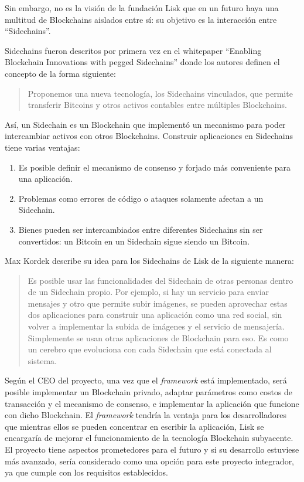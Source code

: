 Sin embargo, no es la visión de la fundación Lisk que en un futuro haya una multitud de Blockchains aislados entre sí: su objetivo es la interacción entre ``Sidechains''.

 
Sidechains fueron descritos por primera vez en el whitepaper ``Enabling Blockchain Innovations with pegged Sidechains'' donde los autores definen el concepto de la forma siguiente:

\begin{quote}
Proponemos una nueva tecnología, los Sidechains vinculados, que permite transferir Bitcoins y otros activos contables entre múltiples Blockchains.\cite{Back2014EnablingBI}
\end{quote}

Así, un Sidechain es un Blockchain que implementó un mecanismo para poder intercambiar activos con otros Blockchains. Construir aplicaciones en Sidechains tiene varias ventajas:
\begin{enumerate}
\item Es posible definir el mecanismo de consenso y forjado más conveniente para una aplicación.
\item Problemas como errores de código o ataques solamente afectan a un Sidechain.
\item Bienes pueden ser intercambiados entre diferentes Sidechains sin ser convertidos: un Bitcoin en un Sidechain sigue siendo un Bitcoin.
\end{enumerate}

Max Kordek describe su idea para los Sidechains de Lisk de la siguiente manera: 
\begin{quote}
Es posible usar las funcionalidades del Sidechain de otras personas dentro de un Sidechain propio. Por ejemplo, si hay un servicio para enviar mensajes y otro que permite subir imágenes, se pueden aprovechar estas dos aplicaciones para construir una aplicación como una red social, sin volver a implementar la subida de imágenes y el servicio de mensajería. Simplemente se usan otras aplicaciones de Blockchain para eso. Es como un cerebro que evoluciona con cada Sidechain que está conectada al sistema.\cite{youtube_lisk}
\end{quote}

Según el CEO del proyecto, una vez que el \textit{framework} está implementado, será posible implementar un Blockchain privado, adaptar parámetros como costos de transacción y el mecanismo de consenso, e implementar la aplicación que funcione con dicho Blockchain. El \textit{framework} tendría la ventaja para los desarrolladores que mientras ellos se pueden concentrar en escribir la aplicación, Lisk se encargaría de mejorar el funcionamiento de la tecnología Blockchain subyacente. El proyecto tiene aspectos prometedores para el futuro y si su desarrollo estuviese más avanzado, sería considerado como una opción para este proyecto integrador, ya que cumple con los requisitos establecidos.


